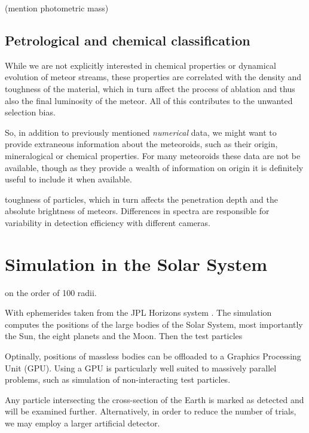                 (mention photometric mass)

            \subsection{Petrological and chemical classification} \label{mpac}
                While we are not explicitly interested in chemical properties
                or dynamical evolution of meteor streams, these properties
                are correlated with the density and toughness of the material,
                which in turn affect the process of ablation
                and thus also the final luminosity of the meteor.
                All of this contributes to the unwanted selection bias.

                So, in addition to previously mentioned \textit{numerical} data, we might want to
                provide extraneous information about the meteoroids, such as their origin,
                mineralogical or chemical properties.
                For many meteoroids these data are not be available,
                though as they provide a wealth of information on origin
                it is definitely useful to include it when available.


                toughness of particles, which in turn affects the penetration depth
                and the absolute brightness of meteors.
                Differences in spectra are responsible for variability in detection efficiency with different cameras.


\section{Simulation in the Solar System} \label{ms}
    on the order of 100 radii.

    With ephemerides taken from the JPL Horizons system \citep{???}.
    The simulation computes the positions of the large bodies of the Solar System, most importantly the Sun,
    the eight planets and the Moon. Then the test particles

    Optinally, positions of massless bodies can be offloaded to a Graphics Processing Unit (GPU).
    Using a GPU is particularly well suited to massively parallel problems, such as simulation of non-interacting test particles.

    Any particle intersecting the cross-section of the Earth is marked as detected and will be examined further.
    Alternatively, in order to reduce the number of trials, we may employ a larger artificial detector.


